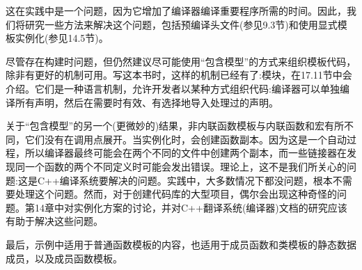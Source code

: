 这在实践中是一个问题，因为它增加了编译器编译重要程序所需的时间。因此，我们将研究一些方法来解决这个问题，包括预编译头文件(参见9.3节)和使用显式模板实例化(参见14.5节)。

尽管存在构建时问题，但仍然建议尽可能使用“包含模型”的方式来组织模板代码，除非有更好的机制可用。写这本书时，这样的机制已经有了:模块，在17.11节中会介绍。它们是一种语言机制，允许开发者以某种方式组织代码:编译器可以单独编译所有声明，然后在需要时有效、有选择地导入处理过的声明。

关于“包含模型”的另一个(更微妙的)结果，非内联函数模板与内联函数和宏有所不同，它们没有在调用点展开。当实例化时，会创建函数副本。因为这是一个自动过程，所以编译器最终可能会在两个不同的文件中创建两个副本，而一些链接器在发现同一个函数的两个不同定义时可能会发出错误。理论上，这不是我们所关心的问题:这是C++编译系统要解决的问题。实践中，大多数情况下都没问题，根本不需要处理这个问题。然而，对于创建代码库的大型项目，偶尔会出现这种奇怪的问题。第14章中对实例化方案的讨论，并对C++翻译系统(编译器)文档的研究应该有助于解决这些问题。

最后，示例中适用于普通函数模板的内容，也适用于成员函数和类模板的静态数据成员，以及成员函数模板。












